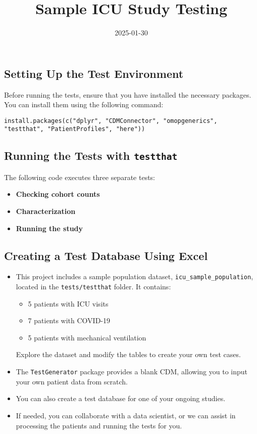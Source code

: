 \documentclass[
]{article}
\title{Sample ICU Study Testing}
\author{}
\date{\vspace{-2.5em}2025-01-30}
\providecommand{\tightlist}{%
  \setlength{\itemsep}{0pt}\setlength{\parskip}{0pt}}
\begin{document}
\maketitle

\subsection{Setting Up the Test
Environment}\label{setting-up-the-test-environment}

Before running the tests, ensure that you have installed the necessary
packages. You can install them using the following command:

\begin{verbatim}
install.packages(c("dplyr", "CDMConnector", "omopgenerics", "testthat", "PatientProfiles", "here"))
\end{verbatim}

\subsection{\texorpdfstring{Running the Tests with
\texttt{testthat}}{Running the Tests with testthat}}\label{running-the-tests-with-testthat}

The following code executes three separate tests:

\begin{itemize}
\tightlist
\item
  \textbf{Checking cohort counts}
\item
  \textbf{Characterization}
\item
  \textbf{Running the study}
\end{itemize}

\subsection{Creating a Test Database Using
Excel}\label{creating-a-test-database-using-excel}

\begin{itemize}
\item
  This project includes a sample population dataset,
  \texttt{icu\_sample\_population}, located in the
  \texttt{tests/testthat} folder. It contains:

  \begin{itemize}
  \tightlist
  \item
    5 patients with ICU visits
  \item
    7 patients with COVID-19
  \item
    5 patients with mechanical ventilation
  \end{itemize}

  Explore the dataset and modify the tables to create your own test
  cases.
\item
  The \texttt{TestGenerator} package provides a blank CDM, allowing you
  to input your own patient data from scratch.
\item
  You can also create a test database for one of your ongoing studies.
\item
  If needed, you can collaborate with a data scientist, or we can assist
  in processing the patients and running the tests for you.
\end{itemize}
\end{document}
